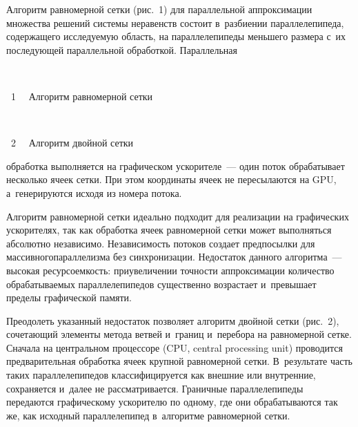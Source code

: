 \begin{multicols}{2}
     Алгоритм равномерной сетки (рис.~1) для параллельной аппроксимации 
множества решений системы неравенств состоит в~разбиении параллелепипеда, 
содержащего исследуемую область, на параллелепипеды меньшего размера 
с~их последующей параллельной обработкой. Параллельная\linebreak\vspace*{-12pt}

{ \begin{center}  %
 \vspace*{12pt}
    \mbox{%
 \epsfxsize=79mm 
 }

\vspace*{6pt}

\noindent
{{\figurename~1}\ \ \small{
Алгоритм равномерной сетки
}}
\end{center}}


{ \begin{center}  %
 \vspace*{-2pt}
    \mbox{%
 \epsfxsize=79mm 
 }

\vspace*{6pt}

\noindent
{{\figurename~2}\ \ \small{
Алгоритм двойной сетки
}}
\end{center}}


\vspace*{6pt}


\noindent
 обработка 
выполняется на графическом ускорителе~--- один поток обрабатывает 
несколько ячеек сетки. При этом координаты ячеек не пересылаются на GPU, 
а~генерируются исходя из номера потока.
     
      

     
     Алгоритм равномерной сетки идеально подходит для реализации на 
графических ускорителях, так как обработка ячеек равномерной сетки может 
выполняться абсолютно независимо. Независимость потоков создает 
предпосылки для массивного\linebreak параллелизма без синхронизации. Недостаток 
данного алгоритма~--- высокая ресурсоемкость: при\linebreak увеличении точности 
аппроксимации количество обрабатываемых параллелепипедов существенно 
возрастает и~превышает пределы графической памяти. 
     
     Преодолеть указанный недостаток позволяет алгоритм двойной сетки 
(рис.~2), сочетающий элементы метода ветвей и~границ и~перебора на 
равномерной сетке. Сначала на центральном процессоре (CPU,
central processing unit) проводится 
предварительная обработка ячеек крупной равномерной сетки. В~результате 
часть таких параллелепипедов классифицируется как внешние или внутренние, 
сохраняется и~далее не рассматривается. Граничные параллелепипеды 
передаются графическому ускорителю по одному, где они обрабатываются так 
же, как исходный параллелепипед в~алгоритме равномерной сетки.
     


\end{multicols}
